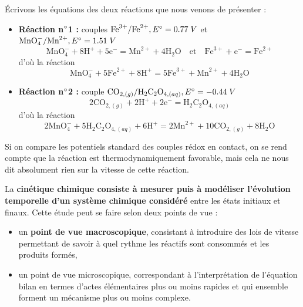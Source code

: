 \documentclass[11pt,a4paper]{report}
\begin{document}
Écrivons les équations des deux réactions que nous venons de présenter :
\begin{itemize}
	\item \textbf{Réaction n$\degree$1 :} couples $\text{Fe}^{3+}/\text{Fe}^{2+}, 
	E\degree = 0.77\;V$ et $\text{MnO}_4^-/\text{Mn}^{2+}, E\degree = 1.51\;V$
	\begin{equation}
		\boxed{\text{MnO}_4^- + 8\text{H}^+ + 5\text{e}^- = \text{Mn}^{2+} + 4\text{H}_2\text{O}}
		\quad\text{et}\quad \boxed{\text{Fe}^{3+} + \text{e}^- = \text{Fe}^{2+}}		 
	\end{equation}
	d'où la réaction
	\begin{equation}
		\boxed{\text{MnO}_4^- + 5\text{Fe}^{2+} + 8\text{H}^+ 
		= 5\text{Fe}^{3+} + \text{Mn}^{2+} + 4\text{H}_2\text{O}}
	\end{equation}
	\item \textbf{Réaction n$\degree$2 :} couple 
	$\text{CO}_{2,(g)}/\text{H}_2\text{C}_2\text{O}_{4,(aq)}, E\degree = -0.44\;V$ 
	\begin{equation}
		\boxed{2\text{CO}_{2,(g)} +2\text{H}^+ + 2\text{e}^-
		= \text{H}_2\text{C}_2\text{O}_{4,(aq)}}
	\end{equation}
	d'où la réaction
	\begin{equation}
		\boxed{2\text{MnO}_4^- + 5\text{H}_2\text{C}_2\text{O}_{4,(aq)} + 6\text{H}^+ 
		= 2\text{Mn}^{2+} + 10\text{CO}_{2,(g)} + 8\text{H}_2\text{O}}
	\end{equation}
\end{itemize}
Si on compare les potentiels standard des couples rédox en contact, on se rend compte que la réaction est thermodynamiquement favorable, mais cela ne nous dit absolument rien sur la vitesse de cette réaction.

La \textbf{cinétique chimique consiste à mesurer puis à modéliser l'évolution temporelle d'un système chimique considéré} entre les états initiaux et finaux. Cette étude peut se faire selon deux points de vue :
\begin{itemize}
	\item un \textbf{point de vue macroscopique}, consistant à introduire des lois de vitesse permettant de savoir à quel rythme les réactifs sont consommés et les produits formés,
	\item un point de vue microscopique, correspondant à l'interprétation de l'équation bilan en termes d'actes élémentaires plus ou moins rapides et qui ensemble forment un mécanisme plus ou moins complexe.\\
\end{itemize}
\end{document}
